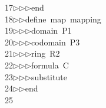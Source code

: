 \begin{tabbing}
17\>$\triangleright$\>$\triangleright$\>$\triangleright$\>end\ \\[0pt]
18\>$\triangleright$\>$\triangleright$\>define\ map\ mapping\ \\[0pt]
19\>$\triangleright$\>$\triangleright$\>$\triangleright$\>domain\ P1\ \\[0pt]
20\>$\triangleright$\>$\triangleright$\>$\triangleright$\>codomain\ P3\ \\[0pt]
21\>$\triangleright$\>$\triangleright$\>$\triangleright$\>ring\ R2\ \\[0pt]
22\>$\triangleright$\>$\triangleright$\>$\triangleright$\>formula\ C\ \\[0pt]
23\>$\triangleright$\>$\triangleright$\>$\triangleright$\>substitute\ \ \\[0pt]
24\>$\triangleright$\>$\triangleright$\>end\\[0pt]
25\>\end{tabbing}
